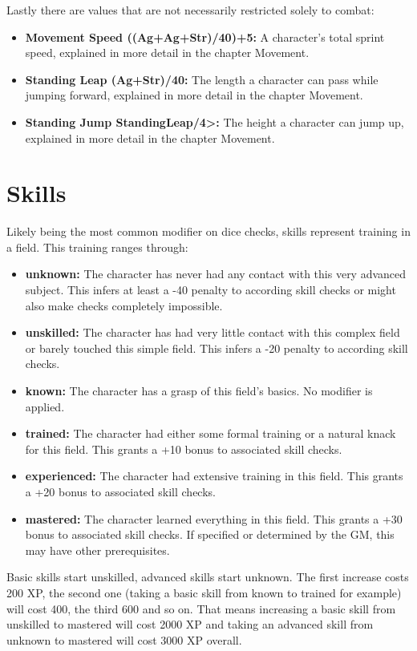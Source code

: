 \documentclass[12pt,a4paper]{book}
\begin{document}
	Lastly there are values that are not necessarily restricted solely to combat:
	\begin{itemize}
		\setlength\itemsep{-8mm}
		\item \textbf{Movement Speed \textlangle((Ag+Ag+Str)/40)+5\textrangle:} A character’s total sprint speed, explained in more detail in the chapter Movement.
		\item \textbf{Standing Leap \textlangle(Ag+Str)/40\textrangle:} The length a character can pass while jumping forward, explained in more detail in the chapter Movement.
		\item \textbf{Standing Jump \textlangle StandingLeap/4>:\textrangle} The height a character can jump up, explained in more detail in the chapter Movement.
	\end{itemize}
	\section{Skills}
	Likely being the most common modifier on dice checks, skills represent training in a field. This training ranges through:
	\begin{itemize}
		\setlength\itemsep{-8mm}
		\item \textbf{unknown:} The character has never had any contact with this very advanced subject. This infers at least a -40 penalty to according skill checks or might also make checks completely impossible.
		\item \textbf{unskilled:} The character has had very little contact with this complex field or barely touched this simple field. This infers a -20 penalty to according skill checks.
		\item \textbf{known:} The character has a grasp of this field’s basics. No modifier is applied.
		\item \textbf{trained:} The character had either some formal training or a natural knack for this field. This grants a +10 bonus to associated skill checks.
		\item \textbf{experienced:} The character had extensive training in this field. This grants a +20 bonus to associated skill checks.
		\item \textbf{mastered:} The character learned everything in this field. This grants a +30 bonus to associated skill checks. If specified or determined by the GM, this may have other prerequisites. 
	\end{itemize}
	Basic skills start unskilled, advanced skills start unknown. The first increase costs 200 XP, the second one (taking a basic skill from known to trained for example) will cost 400, the third 600 and so on. That means increasing a basic skill from unskilled to mastered will cost 2000 XP and taking an advanced skill from unknown to mastered will cost 3000 XP overall.
\end{document}
